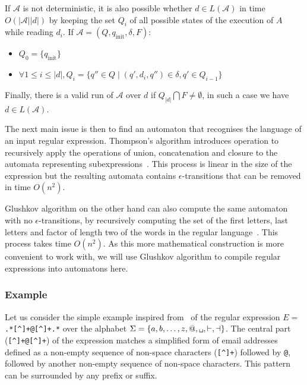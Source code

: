 \documentclass[12px]{article}
\theoremstyle{definition}
\begin{document}
        If $\mathcal{A}$ is not deterministic, it is also possible whether $d
        \in L(\mathcal{A})$ in time $O(|\mathcal{A}| |d|)$ by keeping the set
        $Q_i$ of all possible states of the execution of $A$ while reading
        $d_i$. If $\mathcal{A} = (Q, q_\text{init}, \delta, F)$:
        \begin{itemize}
          \item $Q_0 = \{q_\text{init}\}$
          \item $\forall 1 \leq i \leq |d|, Q_i = \{q'' \in Q \mid (q', d_i,
            q'') \in \delta,
            q' \in Q_{i-1}\}$
        \end{itemize}
        Finally, there is a valid run of $\mathcal{A}$ over $d$ if $Q_{|d|}
        \bigcap F \neq \emptyset$, in such a case we have $d \in
        L(\mathcal{A})$.

        \vspace{0.5cm}

        The next main issue is then to find an automaton that recognises the
        language of an input regular expression. Thompson's algorithm
        introduces operation to recursively apply the operations of union,
        concatenation and closure to the automata representing
        subexpressions~\cite{thompson1968programming}. This process is linear
        in the size of the expression but the resulting automata contains
        $\epsilon$-transitions that can be removed in time $O(n^2)$.

        Glushkov algorithm on the other hand can also compute the same
        automaton with no $\epsilon$-transitions, by recursively computing the
        set of the first letters, last letters and factor of length two of the
        words in the regular language~\cite{glushkov1961abstract}. This process
        takes time $O(n^2)$. As this more mathematical construction is more
        convenient to work with, we will use Glushkov algorithm to compile
        regular expressions into automatons here.

      \subsubsection{Example}%
        \label{sec:example_simple}

        Let us consider the simple example inspired from~\cite{ICDT19} of the
        regular expression $E =$
        \texttt{.*[\textasciicircum\textvisiblespace]+@[\textasciicircum\textvisiblespace]+.*}
        over the alphabet $\Sigma = \{a, b, \ldots, z, @, \texttt
        \textvisiblespace, \vdash, \dashv\}$.  The central part
        (\texttt{[\textasciicircum\textvisiblespace]+@[\textasciicircum\textvisiblespace]+})
        of the expression matches a simplified form of email addresses defined
        as a non-empty sequence of non-space characters
        (\texttt{[\textasciicircum\textvisiblespace]+}) followed by \texttt{@},
        followed by another non-empty sequence of non-space characters. This
        pattern can be surrounded by any prefix or suffix.
\end{document}
